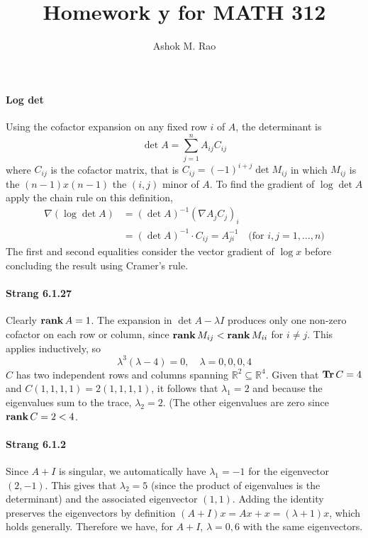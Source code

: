 \documentclass[10pt]{scrartcl}
\title{Homework y for MATH 312}
\author{Ashok M. Rao}
\newcommand{\Tr}{\mathop{\bf Tr}}
\newcommand{\rank}{\mathop{\bf rank}}
\begin{document}
\maketitle
{}

\paragraph{Log det} Using the cofactor expansion on any fixed row $i$ of $A$, the determinant is
\[\det{A} = \sum_{j=1}^{n} A_{ij} C_{ij}\]
where $C_{ij}$ is the cofactor matrix, that is $C_{ij} = (-1)^{i+j}\det{M_{ij}}$ in which $M_{ij}$ is the $(n-1)x(n-1)$ the $(i,j)$ minor of $A$. To find the gradient of $\log\det{A}$ apply the chain rule on this definition,
\begin{align*}
	\nabla(\log\det{A}) &= (\det{A})^{-1}\left(\nabla A_{j} C_{j}\right)_{i}  \\
	&= (\det{A})^{-1}\cdot C_{ij} = A^{-1}_{ji}\quad\text{(for $i,j = 1,\dots, n$)}
\end{align*}
The first and second equalities consider the vector gradient of $\log{x}$ before concluding the result using Cramer's rule. 

\paragraph{Strang 6.1.27}
Clearly $\rank{A} = 1$. The expansion in $\det{A-\lambda I}$ produces only one non-zero cofactor on each row or column, since $\rank{M_{ij}} < \rank{M_{ii}}$ for $i\neq j$. This applies inductively, so 
\[ \lambda^{3}(\lambda - 4) = 0,\quad\lambda = 0,0,0,4\] 
$C$ has two independent rows and columns spanning $\mathbb{R}^{2}\subseteq \mathbb{R}^{4}$. Given that $\Tr{C} = 4$ and $C(1,1,1,1) = 2(1,1,1,1)$, it follows that $\lambda_1 = 2$ and because the eigenvalues sum to the trace, $\lambda_2 = 2$. (The other eigenvalues are zero since $\rank{C} = 2 < 4$. 

\paragraph{Strang 6.1.2} 
Since $A+I$ is singular, we automatically have $\lambda_1 = -1$ for the eigenvector $(2,-1)$. This gives that $\lambda_2 = 5$ (since the product of eigenvalues is the determinant) and the associated eigenvector $(1,1)$. Adding the identity preserves the eigenvectors by definition $(A+I)x = Ax + x = (\lambda+1)x$, which holds generally. Therefore we have, for $A+I$, $\lambda=0,6$ with the same eigenvectors. 
\end{document}
